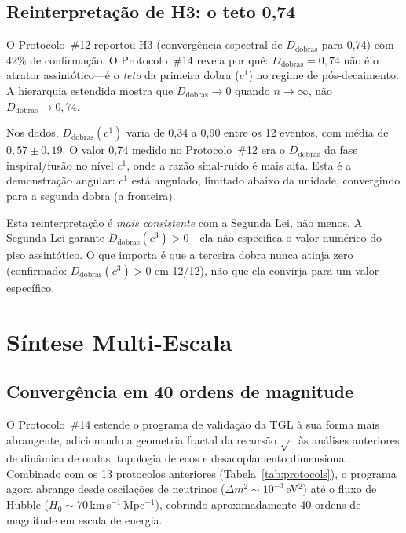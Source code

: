 \documentclass[12pt,a4paper,twocolumn]{article}
\newcommand{\Dfolds}{D_{\text{dobras}}}
\begin{document}
\subsection{Reinterpretação de H3: o teto 0,74}

O Protocolo~\#12 reportou H3 (convergência espectral de $\Dfolds$ para 0,74) com 42\% de confirmação. O Protocolo~\#14 revela por quê: $\Dfolds = 0{,}74$ não é o atrator assintótico---é o \emph{teto} da primeira dobra ($c^1$) no regime de pós-decaimento. A hierarquia estendida mostra que $\Dfolds \to 0$ quando $n \to \infty$, não $\Dfolds \to 0{,}74$.

Nos dados, $\Dfolds(c^1)$ varia de 0,34 a 0,90 entre os 12 eventos, com média de $0{,}57 \pm 0{,}19$. O valor 0,74 medido no Protocolo~\#12 era o $\Dfolds$ da fase inspiral/fusão no nível $c^1$, onde a razão sinal-ruído é mais alta. Esta é a demonstração angular: $c^1$ está angulado, limitado abaixo da unidade, convergindo para a segunda dobra (a fronteira).

Esta reinterpretação é \emph{mais consistente} com a Segunda Lei, não menos. A Segunda Lei garante $\Dfolds(c^3) > 0$---ela não especifica o valor numérico do piso assintótico. O que importa é que a terceira dobra nunca atinja zero (confirmado: $\Dfolds(c^3) > 0$ em 12/12), não que ela convirja para um valor específico.


\section{Síntese Multi-Escala}
\label{sec:synthesis}

\subsection{Convergência em 40 ordens de magnitude}

O Protocolo~\#14 estende o programa de validação da TGL à sua forma mais abrangente, adicionando a geometria fractal da recursão $\sqrt{\cdot}$ às análises anteriores de dinâmica de ondas, topologia de ecos e desacoplamento dimensional. Combinado com os 13 protocolos anteriores (Tabela~\ref{tab:protocols}), o programa agora abrange desde oscilações de neutrinos ($\Delta m^2 \sim 10^{-3}$\,eV$^2$) até o fluxo de Hubble ($H_0 \sim 70$\,km\,s$^{-1}$\,Mpc$^{-1}$), cobrindo aproximadamente 40 ordens de magnitude em escala de energia.
\end{document}

